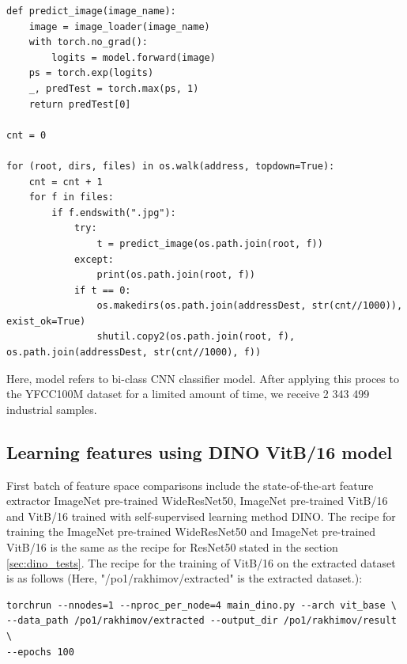 \begin{lstlisting}
def predict_image(image_name):
    image = image_loader(image_name)
    with torch.no_grad():
        logits = model.forward(image)
    ps = torch.exp(logits)
    _, predTest = torch.max(ps, 1)
    return predTest[0]

cnt = 0

for (root, dirs, files) in os.walk(address, topdown=True):
    cnt = cnt + 1
    for f in files:
        if f.endswith(".jpg"):
            try:
                t = predict_image(os.path.join(root, f))
            except:
                print(os.path.join(root, f))
            if t == 0:
                os.makedirs(os.path.join(addressDest, str(cnt//1000)), exist_ok=True)
                shutil.copy2(os.path.join(root, f), os.path.join(addressDest, str(cnt//1000), f))
\end{lstlisting}

Here, model refers to bi-class CNN classifier model. After applying this proces to the YFCC100M dataset for a limited amount of time, we receive 2 343 499 industrial samples.

\subsection{Learning features using DINO VitB/16 model}
First batch of feature space comparisons include the state-of-the-art feature extractor ImageNet pre-trained WideResNet50, ImageNet pre-trained VitB/16 and VitB/16 trained with self-supervised learning method DINO. The recipe for training the ImageNet pre-trained WideResNet50 and ImageNet pre-trained VitB/16 is the same as the recipe for ResNet50 stated in the section \ref{sec:dino_tests}. The recipe for the training of VitB/16 on the extracted dataset is as follows (Here, "/po1/rakhimov/extracted" is the extracted dataset.):

\begin{lstlisting}
torchrun --nnodes=1 --nproc_per_node=4 main_dino.py --arch vit_base \
--data_path /po1/rakhimov/extracted --output_dir /po1/rakhimov/result \ 
--epochs 100
\end{lstlisting}

